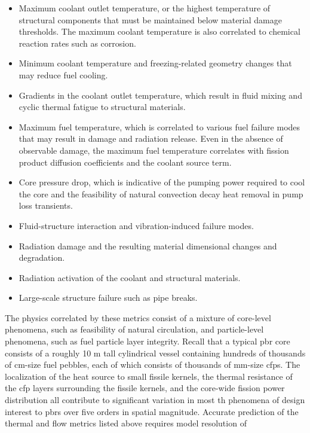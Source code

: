 \begin{itemize}
\item Maximum coolant outlet temperature, or the highest temperature of structural components that must be maintained below material damage thresholds. The maximum coolant temperature is also correlated to chemical reaction rates such as corrosion.
\item Minimum coolant temperature and freezing-related geometry changes that may reduce fuel cooling.
\item Gradients in the coolant outlet temperature, which result in fluid mixing and cyclic thermal fatigue to structural materials.
\item Maximum fuel temperature, which is correlated to various fuel failure modes that may result in damage and radiation release. Even in the absence of observable damage, the maximum fuel temperature correlates with fission product diffusion coefficients and the coolant source term.
\item Core pressure drop, which is indicative of the pumping power required to cool the core and the feasibility of natural convection decay heat removal in pump loss transients.
\item Fluid-structure interaction and vibration-induced failure modes.
\item Radiation damage and the resulting material dimensional changes and degradation.
\item Radiation activation of the coolant and structural materials.
\item Large-scale structure failure such as pipe breaks.
\end{itemize}

The physics correlated by these metrics consist of a mixture of core-level phenomena, such as feasibility of natural circulation, and particle-level phenomena, such as fuel particle layer integrity. Recall that a typical \gls{pbr} core consists of a roughly 10 \si{\meter} tall cylindrical vessel containing hundreds of thousands of \si{\centi\meter}-size fuel pebbles, each of which consists of thousands of \si{\milli\meter}-size \glspl{cfp}. The localization of the heat source to small fissile kernels, the thermal resistance of the \gls{cfp} layers surrounding the fissile kernels, and the core-wide fission power distribution all contribute to significant variation in most \gls{th} phenomena of design interest to \glspl{pbr} over five orders in spatial magnitude. Accurate prediction of the thermal and flow metrics listed above requires model resolution of

